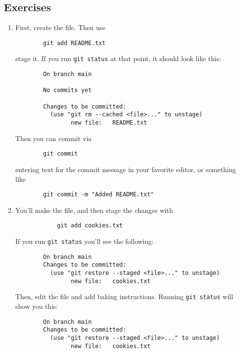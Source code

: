 \subsection{Exercises}
\begin{enumerate}
    \item First, create the file. Then use 
        \begin{verbatim}
        git add README.txt
        \end{verbatim}
        stage it. If you run \verb+git status+ at that point, it should look
        like this:
        \begin{verbatim}
        On branch main

        No commits yet

        Changes to be committed:
          (use "git rm --cached <file>..." to unstage)
                new file:   README.txt
        \end{verbatim}
        Then you can commit via 
        \begin{verbatim}
        git commit
        \end{verbatim}
        entering text for the commit message in your favorite editor, or 
        something like
        \begin{verbatim}
        git commit -m "Added README.txt"
        \end{verbatim}
    \item You'll make the file, and then stage the changes with
        \begin{verbatim}
            git add cookies.txt
        \end{verbatim}
        If you run \verb+git status+ you'll see the following:
        \begin{verbatim}
        On branch main
        Changes to be committed:
          (use "git restore --staged <file>..." to unstage)
                new file:   cookies.txt

        \end{verbatim}
        Then, edit the file and add baking instructions.
        Running \verb+git status+ will show you this:
        \begin{verbatim}
        On branch main
        Changes to be committed:
          (use "git restore --staged <file>..." to unstage)
                new file:   cookies.txt


\end{verbatim}
\end{enumerate}
